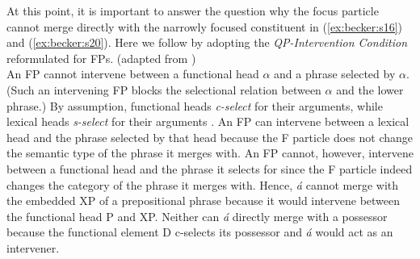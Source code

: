 \documentclass[output=paper,
modfonts
]{langscibook}
\begin{document}
At this point, it is important to answer the question why the focus particle cannot merge directly with the narrowly focused constituent in (\ref{ex:becker:s16}) and (\ref{ex:becker:s20}). Here we follow \citet{Cable2010} by adopting the {\em QP-Intervention Condition} reformulated for FPs.
 (adapted from \citealt[57]{Cable2010})\label{s21}\\
An FP cannot intervene between a functional head $\alpha$ and a phrase selected by $\alpha$. (Such an intervening FP blocks the selectional relation between $\alpha$ and the lower phrase.)
\z
By assumption, functional heads {\em c-select} for their arguments, while lexical heads {\em s-select} for their arguments \citep[][62]{Cable2010}. An FP can intervene between a lexical head and the phrase selected by that head because the F particle does not change the semantic type of the phrase it merges with. An FP cannot, however, intervene between a functional head and the phrase it selects for since the F particle indeed changes the category of the phrase it merges with. Hence, {\em \'a} cannot merge with the embedded XP of a prepositional phrase because it would intervene between the functional head P and XP. Neither can {\em \'a} directly merge with a possessor because the functional element D c-selects its possessor and {\em \'a} would act as an intervener.
\end{document}
